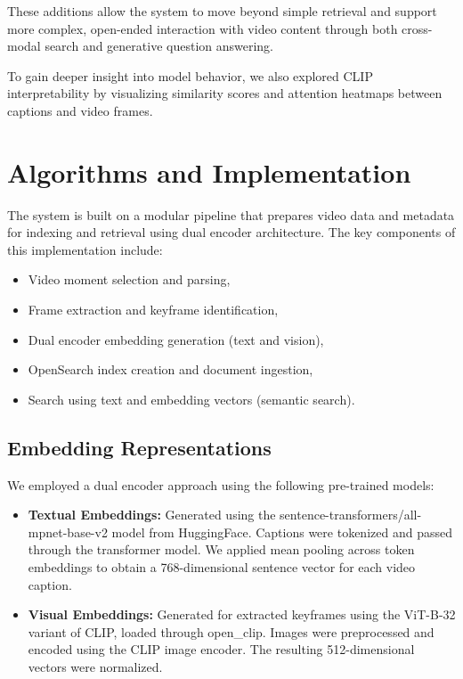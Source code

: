 \documentclass[runningheads]{llncs}
\begin{document}
These additions allow the system to move beyond simple retrieval and support more complex, open-ended interaction with video content through both cross-modal search and generative question answering.

To gain deeper insight into model behavior, we also explored CLIP interpretability by visualizing similarity scores and attention heatmaps between captions and video frames.


\vspace{2\baselineskip plus 0.5\baselineskip minus 0.5\baselineskip} %

\section{Algorithms and Implementation}
The system is built on a modular pipeline that prepares video data and metadata for indexing and retrieval using dual encoder architecture. The key components of this implementation include:

\begin{itemize}
    \item Video moment selection and parsing,
    \item Frame extraction and keyframe identification,
    \item Dual encoder embedding generation (text and vision),
    \item OpenSearch index creation and document ingestion,
    \item Search using text and embedding vectors (semantic search).
\end{itemize}

\pagebreak[3]

\subsection{Embedding Representations}
We employed a dual encoder approach using the following pre-trained models:

\begin{itemize}
    \item \textbf{Textual Embeddings:} Generated using the sentence-transformers/all-mpnet-base-v2 model from HuggingFace. Captions were tokenized and passed through the transformer model. We applied mean pooling across token embeddings to obtain a 768-dimensional sentence vector for each video caption.
    \item \textbf{Visual Embeddings:} Generated for extracted keyframes using the ViT-B-32 variant of CLIP, loaded through open\_clip. Images were preprocessed and encoded using the CLIP image encoder. The resulting 512-dimensional vectors were normalized.
\end{itemize}
\end{document}
